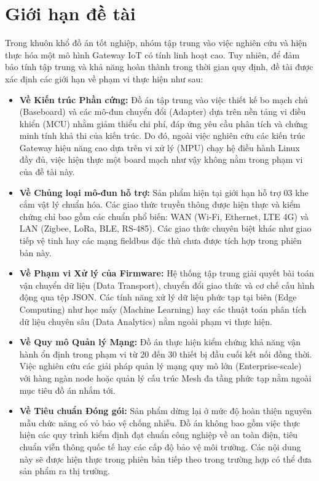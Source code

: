 \section{Giới hạn đề tài}
    Trong khuôn khổ đồ án tốt nghiệp, nhóm tập trung vào việc nghiên cứu và hiện thực hóa một mô hình Gateway IoT có tính linh hoạt cao. Tuy nhiên, để đảm bảo tính tập trung và khả năng hoàn thành trong thời gian quy định, đề tài được xác định các giới hạn về phạm vi thực hiện như sau:

    \begin{itemize}
        \item \textbf{Về Kiến trúc Phần cứng:} Đồ án tập trung vào việc thiết kế bo mạch chủ (Baseboard) và các mô-đun chuyển đổi (Adapter) dựa trên nền tảng vi điều khiển (MCU) nhằm giảm thiểu chi phí, đáp ứng yêu cầu phân tích và chứng minh tính khả thi của kiến trúc. Do đó, ngoài việc nghiên cứu các kiến trúc Gateway hiệu năng cao dựa trên vi xử lý (MPU) chạy hệ điều hành Linux đầy đủ, việc hiện thực một board mạch như vậy không nằm trong phạm vi của đề tài này.
        
        \item \textbf{Về Chủng loại mô-đun hỗ trợ:} Sản phẩm hiện tại giới hạn hỗ trợ 03 khe cắm vật lý chuẩn hóa. Các giao thức truyền thông được hiện thực và kiểm chứng chỉ bao gồm các chuẩn phổ biến: WAN (Wi-Fi, Ethernet, LTE 4G) và LAN (Zigbee, LoRa, BLE, RS-485). Các giao thức chuyên biệt khác như giao tiếp vệ tinh hay các mạng fieldbus đặc thù chưa được tích hợp trong phiên bản này.
        
        \item \textbf{Về Phạm vi Xử lý của Firmware:} Hệ thống tập trung giải quyết bài toán vận chuyển dữ liệu (Data Transport), chuyển đổi giao thức và cơ chế cấu hình động qua tệp JSON. Các tính năng xử lý dữ liệu phức tạp tại biên (Edge Computing) như học máy (Machine Learning) hay các thuật toán phân tích dữ liệu chuyên sâu (Data Analytics) nằm ngoài phạm vi thực hiện.
        
        \item \textbf{Về Quy mô Quản lý Mạng:} Đồ án thực hiện kiểm chứng khả năng vận hành ổn định trong phạm vi từ 20 đến 30 thiết bị đầu cuối kết nối đồng thời. Việc nghiên cứu các giải pháp quản lý mạng quy mô lớn (Enterprise-scale) với hàng ngàn node hoặc quản lý cấu trúc Mesh đa tầng phức tạp nằm ngoài mục tiêu đồ án nhắm tới.
        
        \item \textbf{Về Tiêu chuẩn Đóng gói:} Sản phẩm dừng lại ở mức độ hoàn thiện nguyên mẫu chức năng có vỏ bảo vệ chống nhiễu. Đồ án không bao gồm việc thực hiện các quy trình kiểm định đạt chuẩn công nghiệp về an toàn điện, tiêu chuẩn viễn thông quốc tế hay các cấp độ bảo vệ môi trường. Các nội dung này sẽ được hiện thực trong phiên bản tiếp theo trong trường hợp có thể đưa sản phẩm ra thị trường.
    \end{itemize}